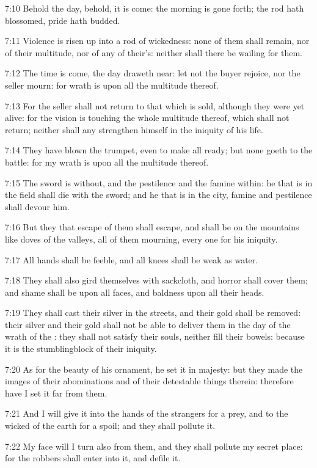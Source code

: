 7:10 Behold the day, behold, it is come: the morning is gone forth;
the rod hath blossomed, pride hath budded.

7:11 Violence is risen up into a rod of wickedness: none of them shall
remain, nor of their multitude, nor of any of their's: neither shall
there be wailing for them.

7:12 The time is come, the day draweth near: let not the buyer
rejoice, nor the seller mourn: for wrath is upon all the multitude
thereof.

7:13 For the seller shall not return to that which is sold, although
they were yet alive: for the vision is touching the whole multitude
thereof, which shall not return; neither shall any strengthen himself
in the iniquity of his life.

7:14 They have blown the trumpet, even to make all ready; but none
goeth to the battle: for my wrath is upon all the multitude thereof.

7:15 The sword is without, and the pestilence and the famine within:
he that is in the field shall die with the sword; and he that is in
the city, famine and pestilence shall devour him.

7:16 But they that escape of them shall escape, and shall be on the
mountains like doves of the valleys, all of them mourning, every one
for his iniquity.

7:17 All hands shall be feeble, and all knees shall be weak as water.

7:18 They shall also gird themselves with sackcloth, and horror shall
cover them; and shame shall be upon all faces, and baldness upon all
their heads.

7:19 They shall cast their silver in the streets, and their gold shall
be removed: their silver and their gold shall not be able to deliver
them in the day of the wrath of the \LORD: they shall not satisfy their
souls, neither fill their bowels: because it is the stumblingblock of
their iniquity.

7:20 As for the beauty of his ornament, he set it in majesty: but they
made the images of their abominations and of their detestable things
therein: therefore have I set it far from them.

7:21 And I will give it into the hands of the strangers for a prey,
and to the wicked of the earth for a spoil; and they shall pollute it.

7:22 My face will I turn also from them, and they shall pollute my
secret place: for the robbers shall enter into it, and defile it.

